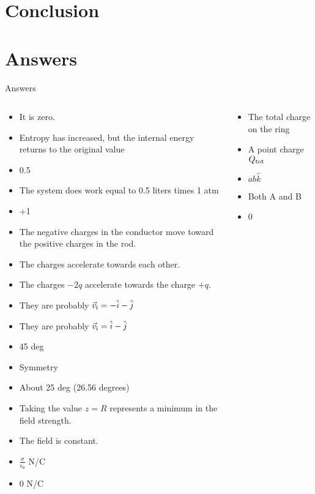 \documentclass{beamer}
\begin{document}
\section{Conclusion}

\section{Answers}

\begin{frame}{Answers}
\tiny
\begin{columns}[T]
\begin{column}{0.5\textwidth}
\begin{itemize}
\item It is zero.
\item Entropy has increased, but the internal energy returns to the original value
\item 0.5
\item The system does work equal to 0.5 liters times 1 atm
\item +1
\item The negative charges in the conductor move toward the positive charges in the rod.
\item The charges accelerate towards each other.
\item The charges $-2q$ accelerate towards the charge $+q$.
\item They are probably $\vec{v}_{\rm i} = -\hat{i}-\hat{j}$
\item They are probably $\vec{v}_{\rm i} = \hat{i}-\hat{j}$
\item 45 deg
\item Symmetry
\item About 25 deg (26.56 degrees)
\item Taking the value $z = R$ represents a minimum in the field strength.
\item The field is constant.
\item $\frac{\sigma}{\epsilon_0}$ N/C
\item 0 N/C
\end{itemize}
\end{column}
\begin{column}{0.5\textwidth}
\begin{itemize}
\item The total charge on the ring
\item A point charge $Q_{\rm tot}$
\item $ab \hat{k}$
\item Both A and B
\item $0$
\end{itemize}
\end{column}
\end{columns}
\end{frame}
\end{document}
